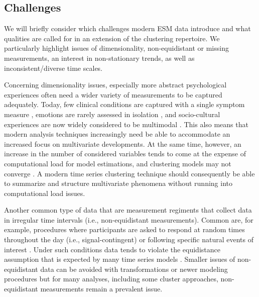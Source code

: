 \documentclass[man, 12pt, a4paper, mask, floatsintext]{apa7}
\theoremstyle{break}
\theoremstyle{plain}
\begin{document}
\subsection{Challenges}

We will briefly consider which challenges modern ESM data introduce and what qualities are called for in an extension of the clustering repertoire. We particularly highlight issues of dimensionality, non-equidistant or missing measurements, an interest in non-stationary trends, as well as inconsistent/diverse time scales. 

Concerning dimensionality issues, especially more abstract psychological experiences often need a wider variety of measurements to be captured adequately. Today, few clinical conditions are captured with a single symptom measure \citep[e.g.,][]{cramer2016}, emotions are rarely assessed in isolation \citep[e.g.,][]{reitsema2022}, and socio-cultural experiences are now widely considered to be multimodal \citep[e.g.,][]{Kreienkamp2022d}. This also means that modern analysis techniques increasingly need be able to accommodate an increased focus on multivariate developments. At the same time, however, an increase in the number of considered variables tends to come at the expense of computational load for model estimations, and clustering models may not converge \citep[the aforementioned dimensionality curse;][]{altman2018}. A modern time series clustering technique should consequently be able to summarize and structure multivariate phenomena without running into computational load issues.

Another common type of data that are measurement regiments that collect data in irregular time intervals (i.e., non-equidistant measurements). Common are, for example, procedures where participants are asked to respond at random times throughout the day (i.e., signal-contingent) or following specific natural events of interest \citep[i.e., event-contingent; see][]{shiffman2008, myin-germeys2018}. Under such conditions data tends to violate the equidistance assumption that is expected by many time series models \citep[][]{hamaker2017}. Smaller issues of non-equidistant data can be avoided with transformations \citep[e.g., dynamic time warping,][]{berndt1994} or newer modeling procedures \citep[e.g., continuous-time models;][]{dehaan-rietdijk2017} but for many analyses, including some cluster approaches, non-equidistant measurements remain a prevalent issue. 
\end{document}
